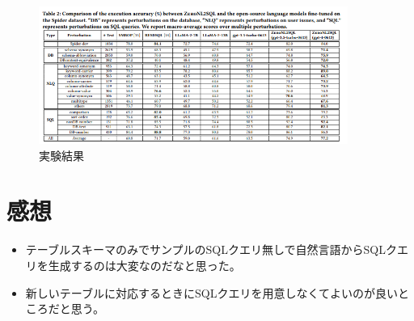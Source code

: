 \documentclass[dvipdfmx,uplatex]{jsarticle}
\theoremstyle{remark}
\newenvironment{kansou}{
    \begin{tcolorbox}[
        colframe=brown,
        colback=brown!10!white,
        colbacktitle=brown!40!white,
        coltitle=black,fonttitle=\bfseries
    ]
}{
    \end{tcolorbox}
}
\begin{document}
\begin{figure}
    \centering
    \includegraphics[width=0.9\textwidth]{img/text2sql-with-slm-and-llm/experiment.png}
    \caption{実験結果}
    \label{fig:experiment}
\end{figure}

\section{感想}
\begin{kansou}
\begin{itemize}
  \item テーブルスキーマのみでサンプルのSQLクエリ無しで自然言語からSQLクエリを生成するのは大変なのだなと思った。
  \item 新しいテーブルに対応するときにSQLクエリを用意しなくてよいのが良いところだと思う。
\end{itemize}
\end{kansou}




\end{document}
